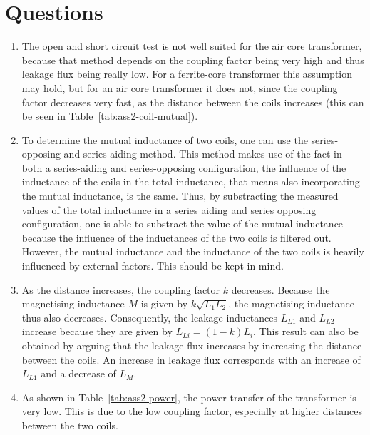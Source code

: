 \documentclass[11pt,titlepage]{report}
\begin{document}
\section*{Questions}
\begin{enumerate}
\item
The open and short circuit test is not well suited for the air core transformer, because that method depends on the coupling factor being very high and thus leakage flux being really low. For a ferrite-core transformer this assumption may hold, but for an air core transformer it does not, since the coupling factor decreases very fast, as the distance between the coils increases (this can be seen in Table~\ref{tab:ass2-coil-mutual}).

\item
To determine the mutual inductance of two coils, one can use the series-opposing and series-aiding method. This method makes use of the fact in both a series-aiding and series-opposing configuration, the influence of the inductance of the coils in the total inductance, that means also incorporating the mutual inductance, is the same. Thus, by substracting the measured values of the total inductance in a series aiding and series opposing configuration, one is able to substract the value of the mutual inductance because the influence of the inductances of the two coils is filtered out. However, the mutual inductance and the inductance of the two coils is heavily influenced by external factors. This should be kept in mind. 

\item
As the distance increases, the coupling factor $k$ decreases. Because the magnetising inductance $M$ is given by $k \sqrt{L_1 L_2}$, the magnetising inductance thus also decreases. Consequently, the leakage inductances $L_{L1}$ and $L_{L2}$ increase because they are given by $L_{Li}=(1-k) L_{i}$. This result can also be obtained by arguing that the leakage flux increases by increasing the distance between the coils. An increase in leakage flux corresponds with an increase of $L_{L1}$ and a decrease of $L_{M}$.

\item
As shown in Table~\ref{tab:ass2-power}, the power transfer of the transformer is very low. This is due to the low coupling factor, especially at higher distances between the two coils.
\end{enumerate}
\end{document}

